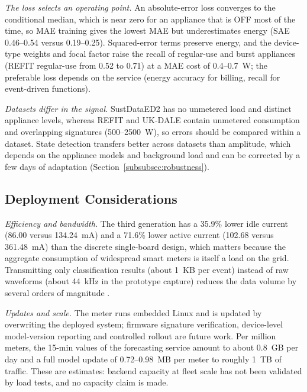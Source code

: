 \documentclass[fleqn,10pt]{wlscirep}
\begin{document}
\textit{The loss selects an operating point.} An absolute-error loss converges to the conditional median, which is near zero for an appliance that is OFF most of the time, so MAE training gives the lowest MAE but underestimates energy (SAE 0.46--0.54 versus 0.19--0.25). Squared-error terms preserve energy, and the device-type weights and focal factor raise the recall of regular-use and burst appliances (REFIT regular-use from 0.52 to 0.71) at a MAE cost of 0.4--0.7~W; the preferable loss depends on the service (energy accuracy for billing, recall for event-driven functions).

\textit{Datasets differ in the signal.} SustDataED2 has no unmetered load and distinct appliance levels, whereas REFIT and UK-DALE contain unmetered consumption and overlapping signatures (500--2500~W), so errors should be compared within a dataset. State detection transfers better across datasets than amplitude, which depends on the appliance models and background load and can be corrected by a few days of adaptation (Section~\ref{subsubsec:robustness}).

\subsection{Deployment Considerations}
\label{subsec:scalability}

\textit{Efficiency and bandwidth.} The third generation has a 35.9\% lower idle current (86.00 versus 134.24~mA) and a 71.6\% lower active current (102.68 versus 361.48~mA) than the discrete single-board design, which matters because the aggregate consumption of widespread smart meters is itself a load on the grid. Transmitting only classification results (about 1~KB per event) instead of raw waveforms (about 44~kHz in the prototype capture) reduces the data volume by several orders of magnitude \cite{Kelly2024}.

\textit{Updates and scale.} The meter runs embedded Linux and is updated by overwriting the deployed system; firmware signature verification, device-level model-version reporting and controlled rollout are future work. Per million meters, the 15-min values of the forecasting service amount to about 0.8~GB per day and a full model update of 0.72--0.98~MB per meter to roughly 1~TB of traffic. These are estimates: backend capacity at fleet scale has not been validated by load tests, and no capacity claim is made.
\end{document}

